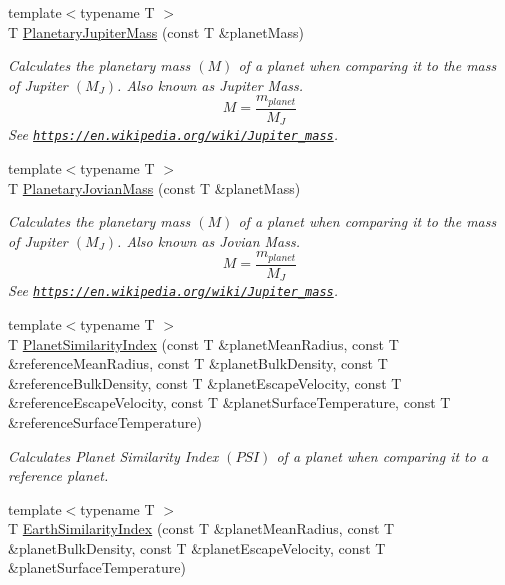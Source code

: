 \begin{DoxyCompactItemize}
{\footnotesize template$<$typename T $>$ }\\T \mbox{\hyperlink{group___e_g_x_phys-_planetary_mass_gaadff5ffa04bb55a572c1403ab9500c06}{Planetary\+Jupiter\+Mass}} (const T \&planet\+Mass)
\begin{DoxyCompactList}\small\item\em Calculates the planetary mass $(M)$ of a planet when comparing it to the mass of Jupiter $(M_J)$. Also known as Jupiter Mass. \[M=\frac{m_{planet}}{M_J}\] See \href{https://en.wikipedia.org/wiki/Jupiter_mass}{\tt https\+://en.\+wikipedia.\+org/wiki/\+Jupiter\+\_\+mass}. \end{DoxyCompactList}\item 
{\footnotesize template$<$typename T $>$ }\\T \mbox{\hyperlink{group___e_g_x_phys-_planetary_mass_ga4663e9388a3bd1a20f94beb52021f293}{Planetary\+Jovian\+Mass}} (const T \&planet\+Mass)
\begin{DoxyCompactList}\small\item\em Calculates the planetary mass $(M)$ of a planet when comparing it to the mass of Jupiter $(M_J)$. Also known as Jovian Mass. \[M=\frac{m_{planet}}{M_J}\] See \href{https://en.wikipedia.org/wiki/Jupiter_mass}{\tt https\+://en.\+wikipedia.\+org/wiki/\+Jupiter\+\_\+mass}. \end{DoxyCompactList}\item 
{\footnotesize template$<$typename T $>$ }\\T \mbox{\hyperlink{group___e_g_x_phys-_planet_criteria_ga62e8b781c301df60bd04af3183a965eb}{Planet\+Similarity\+Index}} (const T \&planet\+Mean\+Radius, const T \&reference\+Mean\+Radius, const T \&planet\+Bulk\+Density, const T \&reference\+Bulk\+Density, const T \&planet\+Escape\+Velocity, const T \&reference\+Escape\+Velocity, const T \&planet\+Surface\+Temperature, const T \&reference\+Surface\+Temperature)
\begin{DoxyCompactList}\small\item\em Calculates Planet Similarity Index $(PSI)$ of a planet when comparing it to a reference planet. \end{DoxyCompactList}\item 
{\footnotesize template$<$typename T $>$ }\\T \mbox{\hyperlink{group___e_g_x_phys-_planet_criteria_ga4b86397b1c839c49ac599d49fda207d4}{Earth\+Similarity\+Index}} (const T \&planet\+Mean\+Radius, const T \&planet\+Bulk\+Density, const T \&planet\+Escape\+Velocity, const T \&planet\+Surface\+Temperature)

\end{DoxyCompactItemize}
